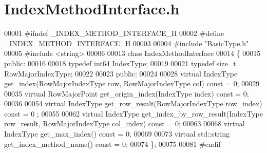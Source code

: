 \section{Index\-Method\-Interface.\-h}
\label{_index_method_interface_8h}

\begin{DoxyCode}
00001 \textcolor{preprocessor}{#ifndef \_INDEX\_METHOD\_INTERFACE\_H}
00002 \textcolor{preprocessor}{}\textcolor{preprocessor}{#define \_INDEX\_METHOD\_INTERFACE\_H}
00003 \textcolor{preprocessor}{}
00004 \textcolor{preprocessor}{#include "BasicType.h"}
00005 \textcolor{preprocessor}{#include <string>}
00006 
00013 \textcolor{keyword}{class }IndexMethodInterface
00014 \{
00015 \textcolor{keyword}{public}:
00016 
00018         \textcolor{keyword}{typedef} int64 IndexType;
00019 
00021         \textcolor{keyword}{typedef} \textcolor{keywordtype}{size\_t} RowMajorIndexType;
00022 
00023 \textcolor{keyword}{public}:
00024 
00028         \textcolor{keyword}{virtual} IndexType get_index(RowMajorIndexType row, RowMajorIndexType 
      col) \textcolor{keyword}{const} = 0;
00029 
00035         \textcolor{keyword}{virtual} RowMajorPoint get_origin_index(IndexType index) \textcolor{keyword}{const} = 0;
00036 
00054         \textcolor{keyword}{virtual} IndexType get_row_result(RowMajorIndexType row\_index) \textcolor{keyword}{const} = 0
      ;
00055 
00062         \textcolor{keyword}{virtual} IndexType get_index_by_row_result(IndexType row\_result, 
      RowMajorIndexType col\_index) \textcolor{keyword}{const} = 0;
00063 
00068         \textcolor{keyword}{virtual} IndexType get_max_index() \textcolor{keyword}{const} = 0;
00069 
00073         \textcolor{keyword}{virtual} std::string get_index_method_name() \textcolor{keyword}{const} = 0;
00074 \};
00075 
00081 \textcolor{preprocessor}{#endif}
\end{DoxyCode}
